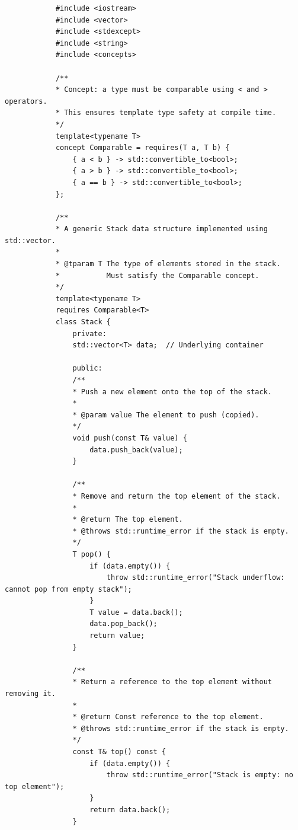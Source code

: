 \documentclass{matinbook}
\begin{document}
    \begin{latin}
        \begin{verbatim}
            #include <iostream>
            #include <vector>
            #include <stdexcept>
            #include <string>
            #include <concepts>
            
            /**
            * Concept: a type must be comparable using < and > operators.
            * This ensures template type safety at compile time.
            */
            template<typename T>
            concept Comparable = requires(T a, T b) {
                { a < b } -> std::convertible_to<bool>;
                { a > b } -> std::convertible_to<bool>;
                { a == b } -> std::convertible_to<bool>;
            };
            
            /**
            * A generic Stack data structure implemented using std::vector.
            * 
            * @tparam T The type of elements stored in the stack.
            *           Must satisfy the Comparable concept.
            */
            template<typename T>
            requires Comparable<T>
            class Stack {
                private:
                std::vector<T> data;  // Underlying container
                
                public:
                /**
                * Push a new element onto the top of the stack.
                * 
                * @param value The element to push (copied).
                */
                void push(const T& value) {
                    data.push_back(value);
                }
                
                /**
                * Remove and return the top element of the stack.
                * 
                * @return The top element.
                * @throws std::runtime_error if the stack is empty.
                */
                T pop() {
                    if (data.empty()) {
                        throw std::runtime_error("Stack underflow: cannot pop from empty stack");
                    }
                    T value = data.back();
                    data.pop_back();
                    return value;
                }
                
                /**
                * Return a reference to the top element without removing it.
                * 
                * @return Const reference to the top element.
                * @throws std::runtime_error if the stack is empty.
                */
                const T& top() const {
                    if (data.empty()) {
                        throw std::runtime_error("Stack is empty: no top element");
                    }
                    return data.back();
                }
                

\end{verbatim}
\end{latin}
\end{document}

